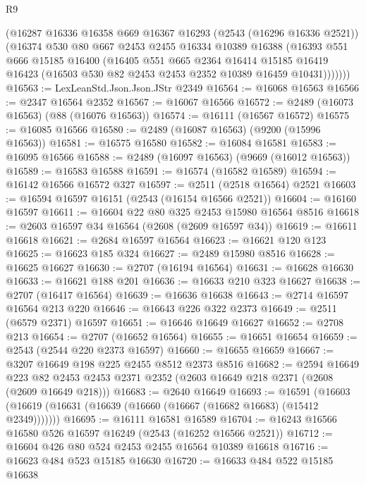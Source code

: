 \begin{lexlean}{R9}
\begin{coremodule}
        (@16287
          @16336
          @16358
          @669
          @16367
          @16293
          (@2543 (@16296 @16336 @2521))
          (@16374
            @530
            @80
            @667
            @2453
            @2455
            @16334
            @10389
            @16388
            (@16393
              @551
              @666
              @15185
              @16400
              (@16405
                @551
                @665
                @2364
                @16414
                @15185
                @16419
                @16423
                (@16503 @530 @82 @2453 @2453 @2352 @10389 @16459 @10431)))))))
@16563 := LexLeanStd.Json.Json.JStr @2349
@16564 := @16068 @16563
@16566 := @2347 @16564 @2352
@16567 := @16067 @16566
@16572 := @2489 (@16073 @16563) (@88 (@16076 @16563))
@16574 := @16111 (@16567 @16572)
@16575 := @16085 @16566
@16580 := @2489 (@16087 @16563) (@9200 (@15996 @16563))
@16581 := @16575 @16580
@16582 := @16084 @16581
@16583 := @16095 @16566
@16588 := @2489 (@16097 @16563) (@9669 (@16012 @16563))
@16589 := @16583 @16588
@16591 := @16574 (@16582 @16589)
@16594 := @16142 @16566 @16572 @327
@16597 := @2511 (@2518 @16564) @2521
@16603 := @16594 @16597 @16151 (@2543 (@16154 @16566 @2521))
@16604 := @16160 @16597
@16611 := @16604 @22 @80 @325 @2453 @15980 @16564 @8516
@16618 := @2603 @16597 @34 @16564 (@2608 (@2609 @16597 @34))
@16619 := @16611 @16618
@16621 := @2684 @16597 @16564
@16623 := @16621 @120 @123
@16625 := @16623 @185 @324
@16627 := @2489 @15980 @8516
@16628 := @16625 @16627
@16630 := @2707 (@16194 @16564)
@16631 := @16628 @16630
@16633 := @16621 @188 @201
@16636 := @16633 @210 @323 @16627
@16638 := @2707 (@16417 @16564)
@16639 := @16636 @16638
@16643 := @2714 @16597 @16564 @213 @220
@16646 := @16643 @226 @322 @2373
@16649 := @2511 (@6579 @2371) @16597
@16651 := @16646 @16649 @16627
@16652 := @2708 @213
@16654 := @2707 (@16652 @16564)
@16655 := @16651 @16654
@16659 := @2543 (@2544 @220 @2373 @16597)
@16660 := @16655 @16659
@16667 := @3207 @16649 @198 @225 @2455 @8512 @2373 @8516
@16682 := @2594
    @16649
    @223
    @82
    @2453
    @2453
    @2371
    @2352
    (@2603 @16649 @218 @2371 (@2608 (@2609 @16649 @218)))
@16683 := @2640 @16649
@16693 := @16591
    (@16603 (@16619 (@16631 (@16639 (@16660 (@16667 (@16682 @16683) (@15412 @2349)))))))
@16695 := @16111 @16581 @16589
@16704 := @16243 @16566 @16580 @526 @16597 @16249 (@2543 (@16252 @16566 @2521))
@16712 := @16604 @426 @80 @524 @2453 @2455 @16564 @10389 @16618
@16716 := @16623 @484 @523 @15185 @16630
@16720 := @16633 @484 @522 @15185 @16638

\end{coremodule}
\end{lexlean}
